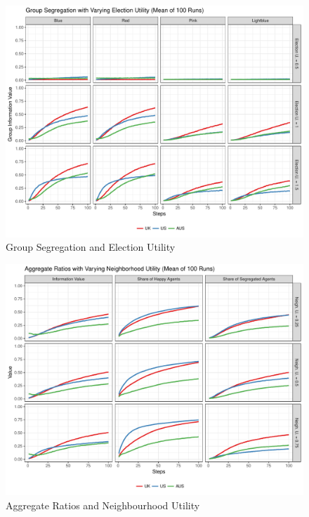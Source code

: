 \documentclass[12pt, a4paper]{article}
\begin{document}
\begin{figure}[bp!]
	\centering
	\caption{Group Segregation and Election Utility}
	\includegraphics[scale=0.6]{./Plots/el_grp_ratios.pdf}
\end{figure}

\begin{figure}[bp!]
	\centering
	\caption{Aggregate Ratios and Neighbourhood Utility}
	\includegraphics[scale=0.6]{./Plots/nb_agg_ratios.pdf}
\end{figure}
\end{document}

